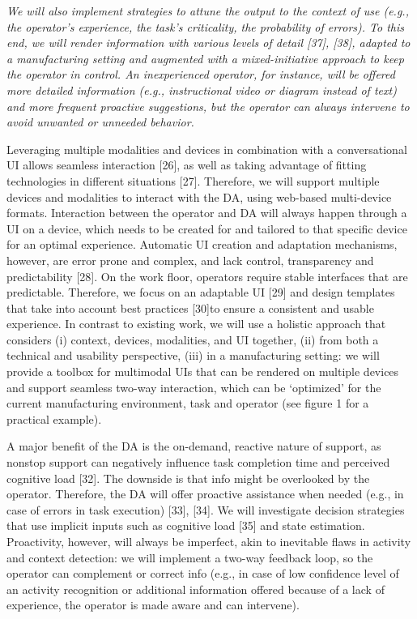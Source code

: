\textit{We will also implement strategies to attune the output to the context of use (e.g., the operator's experience, the task's criticality, the probability of errors). To this end, we will render information with various levels of detail [37], [38], adapted to a manufacturing setting and augmented with a mixed-initiative approach to keep the operator in control. An inexperienced operator, for instance, will be offered more detailed information (e.g., instructional video or diagram instead of text) and more frequent proactive suggestions, but the operator can always intervene to avoid unwanted or unneeded behavior.}


Leveraging multiple modalities and devices in combination with a conversational UI allows seamless interaction [26], as well as taking advantage of fitting technologies in different situations [27]. Therefore, we will support multiple devices and modalities to interact with the DA, using web-based multi-device formats. Interaction between the operator and DA will always happen through a UI on a device, which needs to be created for and tailored to that specific device for an optimal experience. Automatic UI creation and adaptation mechanisms, however, are error prone and complex, and lack control, transparency and predictability [28]. On the work floor, operators require stable interfaces that are predictable. Therefore, we focus on an adaptable
UI [29] and design templates that take into account best practices [30]to ensure a consistent and usable experience. 
In contrast to existing work, we will use a holistic approach that considers (i) context, devices, modalities, and UI together, (ii) from both a technical and usability perspective, (iii) in a manufacturing setting: we will provide a toolbox for multimodal UIs that can be rendered on multiple devices and support seamless two-way interaction, which can be ‘optimized’ for the current manufacturing environment, task and operator (see figure 1 for a practical example).



A major benefit of the DA is the on-demand, reactive nature of support, as nonstop support can negatively influence task completion time and perceived cognitive load [32]. The downside is that info might be overlooked by the operator. Therefore, the DA will offer proactive assistance when needed (e.g., in case of errors in task execution) [33], [34]. We will investigate decision strategies that use implicit inputs such as cognitive load [35] and state estimation. Proactivity, however, will always be imperfect, akin to inevitable flaws in activity and context detection: we will implement a two-way feedback loop, so the operator can complement or correct info (e.g., in case of low
confidence level of an activity recognition or additional information offered because of a lack of experience, the operator is made aware and can intervene). 

